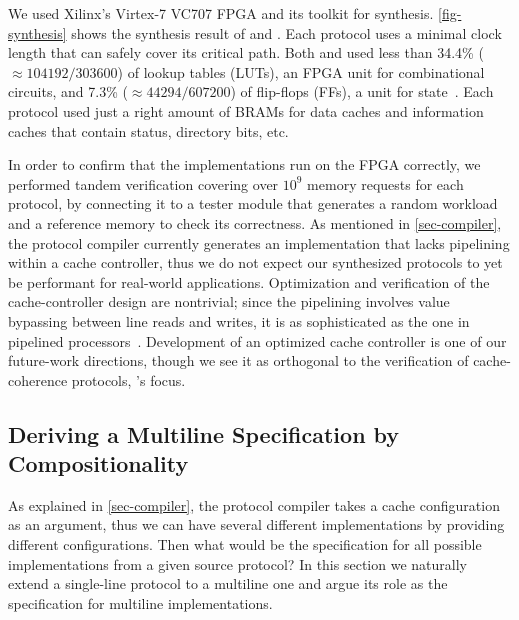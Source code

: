 \documentclass[sigplan,10pt,review,anonymous,screen]{acmart}\settopmatter{printfolios=true,printccs=false,printacmref=false}
\begin{document}
We used Xilinx's Virtex-7 VC707 FPGA and its toolkit for synthesis.
\autoref{fig-synthesis} shows the synthesis result of \bhemh{} and \bhemt{}.
Each protocol uses a minimal clock length that can safely cover its critical path.
Both \bhemh{} and \bhemt{} used less than 34.4\% ($\approx 104192/303600$) of lookup tables (LUTs), an FPGA unit for combinational circuits, and 7.3\% ($\approx 44294/607200$) of flip-flops (FFs), a unit for state~\cite{vc707}.
Each protocol used just a right amount of BRAMs for data caches and information caches that contain status, directory bits, etc.

In order to confirm that the implementations run on the FPGA correctly, we performed tandem verification covering over $10^9$ memory requests for each protocol, by connecting it to a tester module that generates a random workload and a reference memory to check its correctness.
As mentioned in \autoref{sec-compiler}, the protocol compiler currently generates an implementation that lacks pipelining within a cache controller, thus we do not expect our synthesized protocols to yet be performant for real-world applications.
Optimization and verification of the cache-controller design are nontrivial; since the pipelining involves value bypassing between line reads and writes, it is as sophisticated as the one in pipelined processors~\cite{comarch}.
Development of an optimized cache controller is one of our future-work directions, though we see it as orthogonal to the verification of cache-coherence protocols, \hemiola{}'s focus.

\subsection{Deriving a Multiline Specification by Compositionality}
\label{sec-multiline}


As explained in \autoref{sec-compiler}, the protocol compiler takes a cache configuration as an argument, thus we can have several different implementations by providing different configurations.
Then what would be the specification for all possible implementations from a given source protocol?
In this section we naturally extend a single-line \hemiola{} protocol to a multiline one and argue its role as the specification for multiline implementations.
\end{document}
